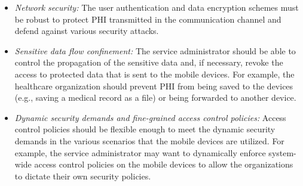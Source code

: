\begin{itemize}
\item \textit{Network security:} The user authentication and data
  encryption schemes must be robust to protect PHI transmitted in the
  communication channel and defend against various security attacks.
\item \textit{Sensitive data flow confinement:} The service
  administrator should be able to control the propagation of the
  sensitive data and, if necessary, revoke the access to protected
  data that is sent to the mobile devices. For example, the healthcare
  organization should prevent PHI from being saved to the devices
  (e.g., saving a medical record as a file) or being forwarded to
  another device.
\item \textit{Dynamic security demands and fine-grained access control
  policies:} Access control policies should be flexible enough to meet
  the dynamic security demands in the various scenarios that the
  mobile devices are utilized. For example, the service administrator
  may want to dynamically enforce system-wide access control policies
  on the mobile devices to allow the organizations to dictate their
  own security policies.  
\end{itemize}
